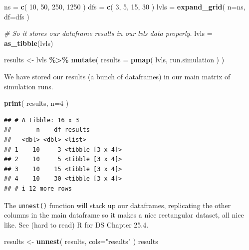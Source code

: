 \documentclass[
]{book}
\newenvironment{Shaded}{\begin{snugshade}}{\end{snugshade}}
\newcommand{\AttributeTok}[1]{\textcolor[rgb]{0.13,0.29,0.53}{#1}}
\newcommand{\CommentTok}[1]{\textcolor[rgb]{0.56,0.35,0.01}{\textit{#1}}}
\newcommand{\DecValTok}[1]{\textcolor[rgb]{0.00,0.00,0.81}{#1}}
\newcommand{\FunctionTok}[1]{\textcolor[rgb]{0.13,0.29,0.53}{\textbf{#1}}}
\newcommand{\NormalTok}[1]{#1}
\newcommand{\OtherTok}[1]{\textcolor[rgb]{0.56,0.35,0.01}{#1}}
\newcommand{\SpecialCharTok}[1]{\textcolor[rgb]{0.81,0.36,0.00}{\textbf{#1}}}
\newcommand{\StringTok}[1]{\textcolor[rgb]{0.31,0.60,0.02}{#1}}
\begin{document}
\begin{Shaded}
\begin{Highlighting}[]
\NormalTok{ns }\OtherTok{=} \FunctionTok{c}\NormalTok{( }\DecValTok{10}\NormalTok{, }\DecValTok{50}\NormalTok{, }\DecValTok{250}\NormalTok{, }\DecValTok{1250}\NormalTok{ )}
\NormalTok{dfs }\OtherTok{=} \FunctionTok{c}\NormalTok{( }\DecValTok{3}\NormalTok{, }\DecValTok{5}\NormalTok{, }\DecValTok{15}\NormalTok{, }\DecValTok{30}\NormalTok{ )}
\NormalTok{lvls }\OtherTok{=} \FunctionTok{expand\_grid}\NormalTok{( }\AttributeTok{n=}\NormalTok{ns, }\AttributeTok{df=}\NormalTok{dfs )}

\CommentTok{\# So it stores our dataframe results in our lvls data properly.}
\NormalTok{lvls }\OtherTok{=} \FunctionTok{as\_tibble}\NormalTok{(lvls)}

\NormalTok{results }\OtherTok{\textless{}{-}}\NormalTok{ lvls }\SpecialCharTok{\%\textgreater{}\%} \FunctionTok{mutate}\NormalTok{( }\AttributeTok{results =} \FunctionTok{pmap}\NormalTok{( lvls, run.simulation ) )}
\end{Highlighting}
\end{Shaded}

We have stored our results (a bunch of dataframes) in our main matrix of
simulation runs.

\begin{Shaded}
\begin{Highlighting}[]
\FunctionTok{print}\NormalTok{( results, }\AttributeTok{n=}\DecValTok{4}\NormalTok{ )}
\end{Highlighting}
\end{Shaded}

\begin{verbatim}
## # A tibble: 16 x 3
##       n    df results         
##   <dbl> <dbl> <list>          
## 1    10     3 <tibble [3 x 4]>
## 2    10     5 <tibble [3 x 4]>
## 3    10    15 <tibble [3 x 4]>
## 4    10    30 <tibble [3 x 4]>
## # i 12 more rows
\end{verbatim}

The \texttt{unnest()} function will stack up our dataframes, replicating the other columns in the main dataframe so it makes a nice rectangular dataset, all nice like. See (hard to read) R for DS Chapter 25.4.

\begin{Shaded}
\begin{Highlighting}[]
\NormalTok{results }\OtherTok{\textless{}{-}} \FunctionTok{unnest}\NormalTok{( results, }\AttributeTok{cols=}\StringTok{"results"}\NormalTok{ )}
\NormalTok{results}
\end{Highlighting}
\end{Shaded}
\end{document}
